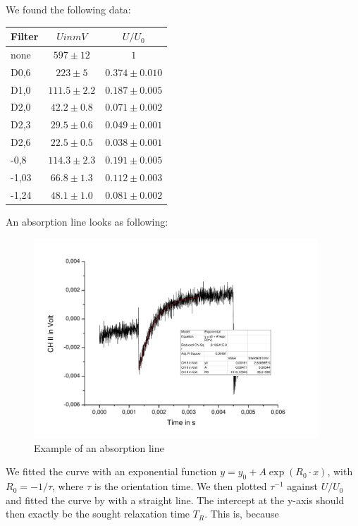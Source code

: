 We found the following data:

\begin{center}
\begin{tabular}[H]{l | c c}
Filter & $U in mV$ & $U/U_0$ \\ \hline
none & $597 \pm 12$ &    $1$\\
D0,6 & $223 \pm 5$ &        $0.374 \pm 0.010$ \\
D1,0 & $111.5 \pm 2.2$ & $ 0.187 \pm 0.005$ \\
D2,0 & $42.2 \pm 0.8$ &   $ 0.071 \pm 0.002$\\
D2,3 & $29.5 \pm 0.6$ &   $ 0.049 \pm 0.001$\\
D2,6 & $22.5 \pm 0.5$ &    $0.038 \pm 0.001$\\
-0,8  & $114.3 \pm 2.3$ &  $0.191 \pm 0.005$\\
-1,03 & $66.8 \pm 1.3 $&   $0.112 \pm 0.003$\\
-1,24 & $48.1 \pm 1.0$ &   $0.081 \pm 0.002$\\
\end{tabular}
\end{center}

An absorption line looks as following: 

\begin{figure}[H]
\centering \includegraphics[width=0.95\textwidth]{BilderAusw/DehmeltBsp.pdf}
\caption{Example of an absorption line}
\label{dehmeltbsp}
\end{figure}

We fitted the curve with an exponential function $y=y_0 + A\exp(R_0\cdot x)$, with $R_0 = -1/\tau$, where $\tau$ is the orientation time. We then plotted $\tau^{-1}$ against $U/U_0$ and fitted the curve by with a straight line. The intercept at the y-axis should then exactly be the sought relaxation time $T_R$. This is, because

